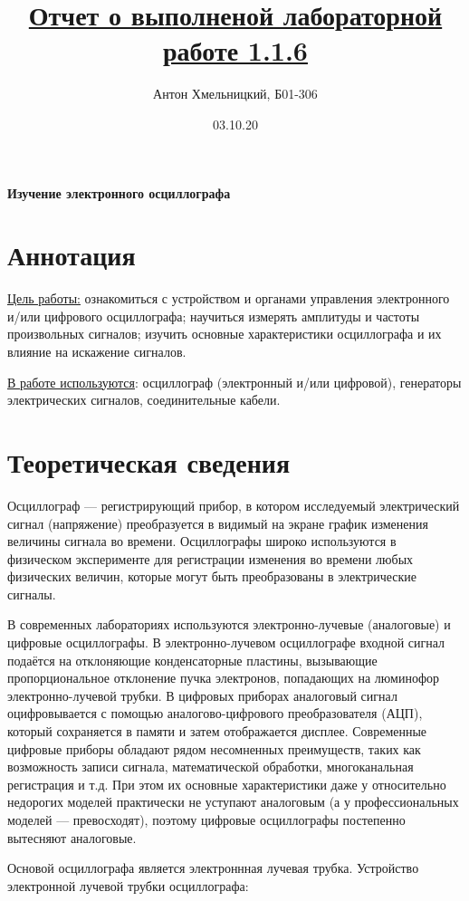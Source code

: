 \documentclass[a4paper]{article}
\title{\underline{Отчет о выполненой лабораторной работе 1.1.6}}
\author{Антон Хмельницкий, Б01-306}
\date{03.10.20}
\begin{document}
\maketitle


\begin{center}
\textbf{\Large Изучение электронного осциллографа}
\end{center}


\section{Аннотация}
\underline{Цель работы:} ознакомиться с устройством и органами управления электронного и/или цифрового осциллографа; научиться измерять амплитуды и частоты произвольных сигналов; изучить основные характеристики осциллографа и их влияние на искажение сигналов.

\underline{В работе используются}: осциллограф (электронный и/или цифровой), генераторы электрических сигналов, соединительные кабели.

\section{Теоретическая сведения}
Осциллограф — регистрирующий прибор, в котором исследуемый электрический сигнал (напряжение) преобразуется в видимый на экране график изменения величины сигнала во времени. Осциллографы широко используются в физическом эксперименте для регистрации изменения во времени любых физических величин, которые могут быть преобразованы в электрические сигналы.

В современных лабораториях используются электронно-лучевые (аналоговые) и цифровые осциллографы. В электронно-лучевом осциллографе входной сигнал подаётся на отклоняющие конденсаторные пластины, вызывающие пропорциональное отклонение пучка электронов, попадающих на люминофор электронно-лучевой трубки. В цифровых приборах аналоговый сигнал оцифровывается с помощью аналогово-цифрового преобразователя (АЦП), который сохраняется в памяти и затем отображается дисплее. Современные цифровые приборы обладают рядом несомненных преимуществ, таких как возможность записи сигнала, математической обработки, многоканальная регистрация и т.д. При этом их основные характеристики даже у относительно недорогих моделей практически не уступают аналоговым (а у профессиональных моделей — превосходят), поэтому цифровые осциллографы постепенно вытесняют аналоговые.


Основой осциллографа является электроннная лучевая трубка. Устройство электронной лучевой трубки осциллографа:
\end{document}
